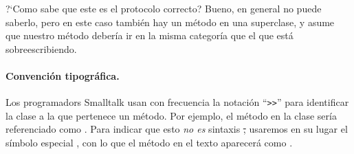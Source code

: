 \documentclass[a4paper,10pt,twoside]{book}
\begin{document}
?`Como sabe \pharo que este es el protocolo correcto? Bueno, en general  \pharo{} no puede saberlo, pero en este caso tambi\'en hay un m\'etodo  en una superclase, y \pharo asume que nuestro m\'etodo  deber\'ia ir en la misma categor\'ia que el que est\'a sobreescribiendo. 


\paragraph{Convenci\'on tipogr\'afica.} Los programadors Smalltalk usan con frecuencia la notaci\'on ``\verb|>>|'' para identificar la clase a la que pertenece un m\'etodo. Por ejemplo, el m\'etodo  en la clase  ser\'ia referenciado como .
Para indicar que esto \emph{no es} sintaxis \st, usaremos en su lugar el s\'imbolo especial \ct{>>>}, con lo que el m\'etodo en el texto aparecer\'a como .
\end{document}
